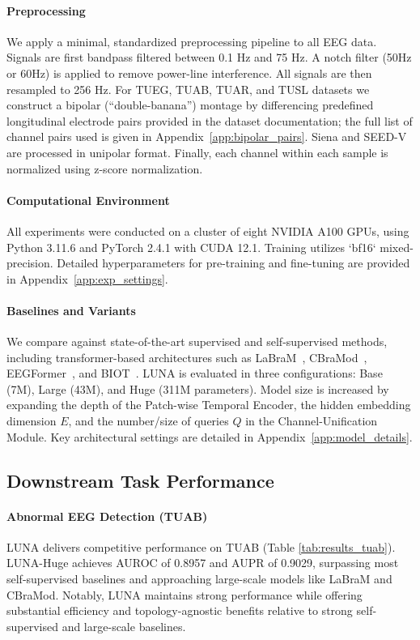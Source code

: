 \paragraph{Preprocessing}
We apply a minimal, standardized preprocessing pipeline to all EEG data. Signals are first bandpass filtered between 0.1 Hz and 75 Hz. A notch filter (50Hz or 60Hz) is applied to remove power-line interference. All signals are then resampled to 256 Hz. 
For TUEG, TUAB, TUAR, and TUSL datasets we construct a bipolar (“double-banana”) montage by differencing predefined longitudinal electrode pairs provided in the dataset documentation; the full list of channel pairs used is given in Appendix~\ref{app:bipolar_pairs}. Siena and SEED-V are processed in unipolar format. Finally, each channel within each sample is normalized using z-score normalization.

\paragraph{Computational Environment}
All experiments were conducted on a cluster of eight NVIDIA A100 GPUs, using Python 3.11.6 and PyTorch 2.4.1 with CUDA 12.1. Training utilizes `bf16` mixed-precision. Detailed hyperparameters for pre-training and fine-tuning are provided in Appendix~\ref{app:exp_settings}.

\paragraph{Baselines and Variants} 
We compare against state-of-the-art supervised and self-supervised methods, including transformer-based architectures such as LaBraM~\citep{jiang2024large}, CBraMod~\citep{wang2024cbramod}, EEGFormer~\citep{chen2024eegformer}, and BIOT~\citep{yang2023biot}. LUNA is evaluated in three configurations: Base (7M), Large (43M), and Huge (311M parameters). Model size is increased by expanding the depth of the Patch-wise Temporal Encoder, the hidden embedding dimension \(E\), and the number/size of queries \(Q\) in the Channel-Unification Module. Key architectural settings are detailed in Appendix~\ref{app:model_details}.

\subsection{Downstream Task Performance}
\label{subsec:downstream_results}

\paragraph{Abnormal EEG Detection (TUAB)}
LUNA delivers competitive performance on TUAB (Table \ref{tab:results_tuab}). LUNA-Huge achieves AUROC of 0.8957 and AUPR of 0.9029, surpassing most self-supervised baselines and approaching large-scale models like LaBraM and CBraMod. Notably, LUNA maintains strong performance while offering substantial efficiency and topology-agnostic benefits relative to strong self-supervised and large-scale baselines.

